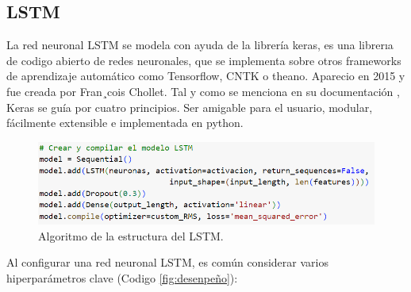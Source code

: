 \subsection{LSTM}

La red neuronal LSTM se modela con ayuda de la librería keras, es una librerıa de codigo abierto de redes neuronales, que se implementa sobre otros frameworks de aprendizaje automático como Tensorflow, CNTK o theano. Aparecio en 2015 y fue creada por Fran¸cois Chollet.
Tal y como se menciona en su documentación \cite{keras-doc}, Keras se guía por cuatro principios. Ser amigable para el usuario, modular, fácilmente extensible e implementada en python.

\begin{figure}[H]
  \begin{center}
    \includegraphics[scale=0.40]{./arquitectura LSTM.png}
    \caption{Algoritmo de la estructura del LSTM.}
    \label{fig:estructura_lstm}
  \end{center}
\end{figure}

Al configurar una red neuronal LSTM, es común considerar varios hiperparámetros clave (Codigo \ref{fig:desenpeño}):

